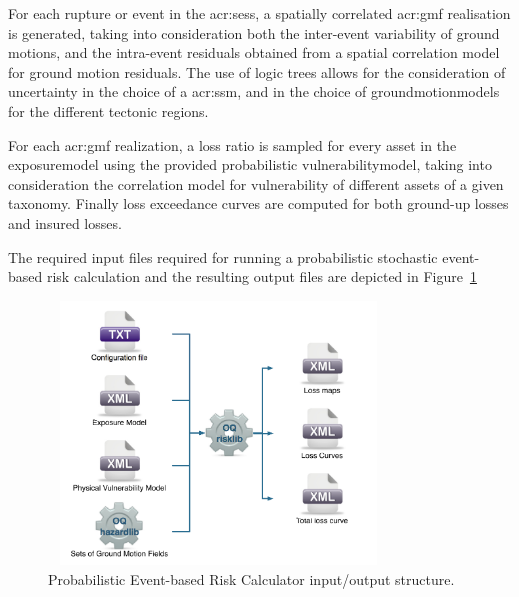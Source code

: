 For each \gls{rupture} or event in the \glspl{acr:ses}, a spatially correlated
\gls{acr:gmf} realisation is generated, taking into consideration both the
inter-event variability of ground motions, and the intra-event residuals
obtained from a spatial correlation model for ground motion residuals. The use
of logic trees allows for the consideration of uncertainty in the choice of a
\glsdesc{acr:ssm}, and in the choice of \glspl{groundmotionmodel} for the
different tectonic regions.

For each \gls{acr:gmf} realization, a loss ratio is sampled for every
\gls{asset} in the \gls{exposuremodel} using the provided probabilistic
\gls{vulnerabilitymodel}, taking into consideration the correlation model for
vulnerability of different \glspl{asset} of a given taxonomy. Finally loss
exceedance curves are computed for both ground-up losses and insured losses.

The required input files required for running a probabilistic stochastic
event-based risk calculation and the resulting output files are depicted in
Figure~\ref{fig:io-structure-event-based-risk}

\begin{figure}[ht]
\centering
\includegraphics[width=9cm,height=7cm]{figures/risk/io-structure-event-based-risk.pdf}
\caption{Probabilistic Event-based Risk Calculator input/output structure.}
\label{fig:io-structure-event-based-risk}
\end{figure}
